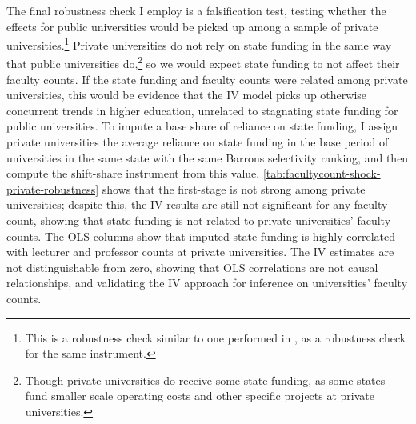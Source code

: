The final robustness check I employ is a falsification test, testing whether the effects for public universities would be picked up among a sample of private universities.\footnote{
    This is a robustness check similar to one performed in \citealt{NBERw27885}, as a robustness check for the same instrument.
}
Private universities do not rely on state funding in the same way that public universities do,\footnote{
    Though private universities do receive some state funding, as some states fund smaller scale operating costs and other specific projects at private universities.
}
so we would expect state funding to not affect their faculty counts.
If the state funding and faculty counts were related among private universities, this would be evidence that the IV model picks up otherwise concurrent trends in higher education, unrelated to stagnating state funding for public universities.
To impute a base share of reliance on state funding, I assign private universities the average reliance on state funding in the base period of universities in the same state with the same Barrons selectivity ranking, and then compute the shift-share instrument from this value.
\autoref{tab:facultycount-shock-private-robustness} shows that the first-stage is not strong among private universities; despite this, the IV results are still not significant for any faculty count, showing that state funding is not related to private universities' faculty counts.
The OLS columns show that imputed state funding is highly correlated with lecturer and professor counts at private universities.
The IV estimates are not distinguishable from zero, showing that OLS correlations are not causal relationships, and validating the IV approach for inference on universities' faculty counts.
